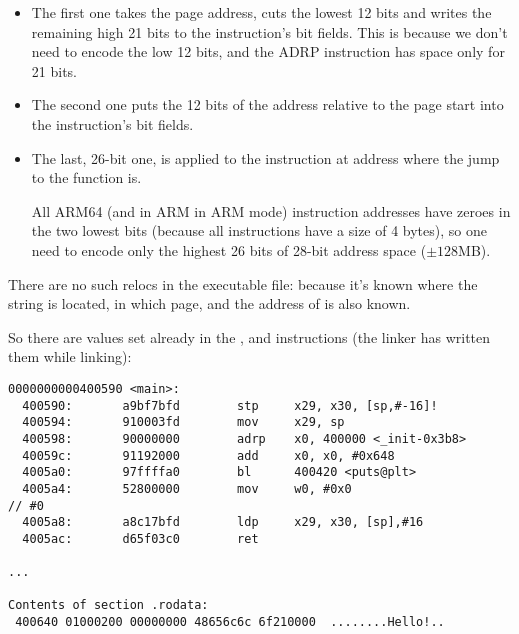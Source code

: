 \begin{itemize}
\item 
The first one takes the page address, cuts the lowest 12 bits and writes the remaining high 21 bits
to the  instruction's bit fields. This is because we don't need to encode the low 12 bits,
and the ADRP instruction has space only for 21 bits.

\item 
The second one puts the 12 bits of the address relative to the page start into the \ADD instruction's bit fields.

\item 
The last, 26-bit one, is applied to the instruction at address  where the 
jump to the \printf function is.

All ARM64 (and in ARM in ARM mode) instruction addresses have zeroes in the two lowest bits
(because all instructions have a size of 4 bytes),
so one need to encode only the highest 26 bits of 28-bit address space ($\pm 128$MB).

\end{itemize}

There are no such relocs in the executable file: because it's known where the  string
is located, in which page, and the address of \puts is also known.

So there are values set already in the , \ADD and  instructions
(the linker has written them while linking):

\begin{lstlisting}[caption=objdump of executable file]
0000000000400590 <main>:
  400590:       a9bf7bfd        stp     x29, x30, [sp,#-16]!
  400594:       910003fd        mov     x29, sp
  400598:       90000000        adrp    x0, 400000 <_init-0x3b8>
  40059c:       91192000        add     x0, x0, #0x648
  4005a0:       97ffffa0        bl      400420 <puts@plt>
  4005a4:       52800000        mov     w0, #0x0                        // #0
  4005a8:       a8c17bfd        ldp     x29, x30, [sp],#16
  4005ac:       d65f03c0        ret

...

Contents of section .rodata:
 400640 01000200 00000000 48656c6c 6f210000  ........Hello!..
\end{lstlisting}


